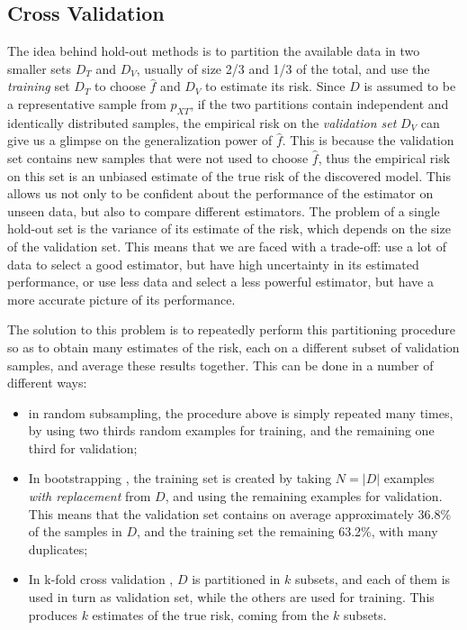 \documentclass[a4paper]{book}
\begin{document}
\subsection{Cross Validation}
\label{sec:cv}
The idea behind hold-out methods is to partition the available data in two smaller sets $D_T$ and $D_V$, usually of size 2/3 and 1/3 of the total, and use the \emph{training} set $D_T$ to choose $\hat{f}$ and $D_V$ to estimate its risk. Since $D$ is assumed to be a representative sample from $p_{XT}$, if the two partitions contain independent and identically distributed samples, the empirical risk on the \emph{validation set} $D_V$ can give us a glimpse on the generalization power of $\hat{f}$. This is because the validation set contains new samples that were not used to choose $\hat{f}$, thus the empirical risk on this set is an unbiased estimate of the true risk of the discovered model. This allows us not only to be confident about the performance of the estimator on unseen data, but also to compare different estimators. The problem of a single hold-out set is the variance of its estimate of the risk, which depends on the size of the validation set. This means that we are faced with a trade-off: use a lot of data to select a good estimator, but have high uncertainty in its estimated performance, or use less data and select a less powerful estimator, but have a more accurate picture of its performance.

The solution to this problem is to repeatedly perform this partitioning procedure so as to obtain many estimates of the risk, each on a different subset of validation samples, and average these results together. This can be done in a number of different ways:

\begin{itemize}
\item in random subsampling, the procedure above is simply repeated many times, by using two thirds random examples for training, and the remaining one third for validation;
\item In bootstrapping \citep{bootstrap}, the training set is created by taking $N=\vert D\vert$ examples \emph{with replacement} from $D$, and using the remaining examples for validation. This means that the validation set contains on average approximately 36.8\% of the samples in $D$, and the training set the remaining 63.2\%, with many duplicates;
\item In k-fold cross validation \citep{kfold}, $D$ is partitioned in $k$ subsets, and each of them is used in turn as validation set, while the others are used for training. This produces $k$ estimates of the true risk, coming from the $k$ subsets.
\end{itemize}
\end{document}

